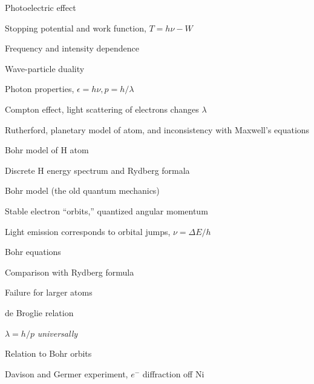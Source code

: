 \message{ !name(Outline.tex)}\documentclass[11pt]{article}
\begin{document}
\begin{outline}
\begin{outline}
  \item{Photoelectric effect}
    \begin{outline}
    \item Stopping potential and work function, $T =h\nu -W$
    \item Frequency and intensity dependence
    \item{Wave-particle duality}
    \item{Photon properties, $\epsilon = h\nu, p=h/\lambda$}
    \item Compton effect, light scattering of electrons changes $\lambda$
    \end{outline}
  
  \item Rutherford, planetary model of atom, and inconsistency with Maxwell's equations
  \item{Bohr model of H atom}
    \begin{outline}
    \item Discrete H energy spectrum and Rydberg formala
    \item Bohr model (the old quantum mechanics)
      \begin{outline}
      \item Stable electron ``orbits,'' quantized angular momentum
      \item Light emission corresponds to orbital jumps, $\nu=\Delta E/h$
      \item Bohr equations
      \item Comparison with Rydberg formula
      \item Failure for larger atoms
      \end{outline}
    \end{outline}
  \item{de Broglie relation}
    \begin{outline}
      \item{$\lambda=h/p$ {\em universally}}
      \item Relation to Bohr orbits
      \item Davison and Germer experiment, $e^-$ diffraction off Ni
    \end{outline}
  \end{outline}
  

\end{outline}
\end{document}
